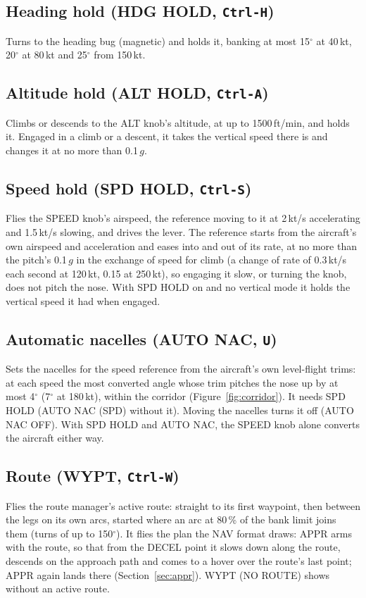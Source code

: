 \documentclass[11pt,a4paper,oneside]{book}
\newcommand{\key}[1]{\texttt{#1}}
\newcommand{\ann}[1]{\textsf{#1}}
\begin{document}
\subsection{Heading hold (HDG HOLD, \key{Ctrl-H})}
Turns to the heading bug (magnetic) and holds it, banking at most 15$^\circ$ at 40\,kt, 20$^\circ$ at 80\,kt and
25$^\circ$ from 150\,kt.

\subsection{Altitude hold (ALT HOLD, \key{Ctrl-A})}
Climbs or descends to the ALT knob's altitude, at up to 1500\,ft/min, and holds it. Engaged in a climb or a descent,
it takes the vertical speed there is and changes it at no more than 0.1\,$g$.

\subsection{Speed hold (SPD HOLD, \key{Ctrl-S})}
Flies the SPEED knob's airspeed, the reference moving to it at 2\,kt/s accelerating and 1.5\,kt/s slowing, and drives
the lever. The reference starts from the aircraft's own airspeed and acceleration and eases into and out of its rate,
at no more than the pitch's 0.1\,$g$ in the exchange of speed for climb (a change of rate of 0.3\,kt/s each second at
120\,kt, 0.15 at 250\,kt), so engaging it slow, or turning the knob, does not pitch the nose. With SPD HOLD on and no
vertical mode it holds the vertical speed it had when engaged.

\subsection{Automatic nacelles (AUTO NAC, \key{U})}
Sets the nacelles for the speed reference from the aircraft's own level-flight trims: at each speed the most converted
angle whose trim pitches the nose up by at most 4$^\circ$ (7$^\circ$ at 180\,kt), within the corridor
(Figure~\ref{fig:corridor}). It needs SPD HOLD (\ann{AUTO NAC (SPD)} without it). Moving the nacelles turns it off
(\ann{AUTO NAC OFF}). With SPD HOLD and AUTO NAC, the SPEED knob alone converts the aircraft either way.

\subsection{Route (WYPT, \key{Ctrl-W})}
Flies the route manager's active route: straight to its first waypoint, then between the legs on its own arcs, started
where an arc at 80\,\% of the bank limit joins them (turns of up to 150$^\circ$). It flies the plan the NAV format draws:
APPR arms with the route, so that from the DECEL point it slows down along the route, descends on the approach path
and comes to a hover over the route's last point; APPR again lands there (Section~\ref{sec:appr}). \ann{WYPT (NO ROUTE)}
shows without an active route.
\end{document}
